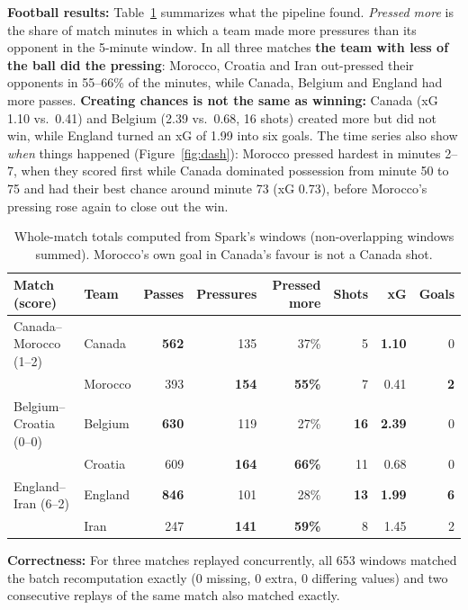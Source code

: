 \documentclass[10pt,a4paper]{article}
\begin{document}
\textbf{Football results:} Table~\ref{tab:football} summarizes what the pipeline found.
\emph{Pressed more} is the share of match minutes in which a team made more pressures than its
opponent in the 5-minute window. In all three matches \textbf{the team with less of the ball did the
pressing}: Morocco, Croatia and Iran out-pressed their opponents in 55--66\% of the minutes, while
Canada, Belgium and England had more passes. \textbf{Creating chances is not the same as winning:}
Canada (xG 1.10 vs.\ 0.41) and Belgium (2.39 vs.\ 0.68, 16 shots) created more but did not win, while England turned an xG of 1.99 into six goals. The time series also show \emph{when} things happened (Figure~\ref{fig:dash}): Morocco pressed hardest in minutes 2--7, when they scored first while Canada dominated possession from minute 50 to 75 and had their best chance around minute 73 (xG 0.73), before Morocco's pressing rose again to close out the win.

\begin{table}[!htb]
\centering\small
\begin{tabular}{llrrrrrr}
\toprule
Match (score) & Team & Passes & Pressures & Pressed more & Shots & xG & Goals \\
\midrule
Canada--Morocco (1--2) & Canada  & \textbf{562} & 135 & 37\% & 5 & \textbf{1.10} & 0 \\
                       & Morocco & 393 & \textbf{154} & \textbf{55\%} & 7 & 0.41 & \textbf{2} \\
Belgium--Croatia (0--0) & Belgium & \textbf{630} & 119 & 27\% & \textbf{16} & \textbf{2.39} & 0 \\
                        & Croatia & 609 & \textbf{164} & \textbf{66\%} & 11 & 0.68 & 0 \\
England--Iran (6--2) & England & \textbf{846} & 101 & 28\% & \textbf{13} & \textbf{1.99} & \textbf{6} \\
                     & Iran    & 247 & \textbf{141} & \textbf{59\%} & 8 & 1.45 & 2 \\
\bottomrule
\end{tabular}
\caption{Whole-match totals computed from Spark's windows (non-overlapping windows summed).
Morocco's own goal in Canada's favour is not a Canada shot.}
\label{tab:football}
\end{table}

\textbf{Correctness:} For three matches replayed concurrently, all 653 windows matched the batch recomputation exactly (0 missing, 0 extra, 0 differing values) and two consecutive replays of the same match also matched exactly.
\end{document}
